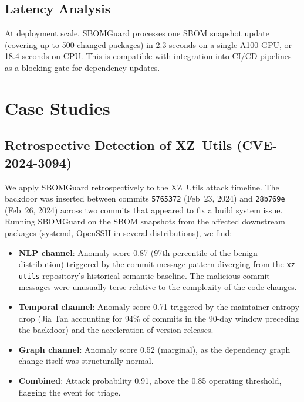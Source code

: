 \documentclass[sigconf,nonacm]{acmart}
\begin{document}
\subsection{Latency Analysis}

At deployment scale, SBOMGuard processes one SBOM snapshot update (covering up to
500 changed packages) in 2.3 seconds on a single A100 GPU, or 18.4 seconds on
CPU. This is compatible with integration into CI/CD pipelines as a blocking gate
for dependency updates.

\section{Case Studies}

\subsection{Retrospective Detection of XZ~Utils (CVE-2024-3094)}

We apply SBOMGuard retrospectively to the XZ~Utils attack timeline. The backdoor
was inserted between commits \texttt{5765372} (Feb~23, 2024) and \texttt{28b769e}
(Feb~26, 2024) across two commits that appeared to fix a build system issue.
Running SBOMGuard on the SBOM snapshots from the affected downstream packages
(systemd, OpenSSH in several distributions), we find:

\begin{itemize}
  \item \textbf{NLP channel}: Anomaly score 0.87 (97th percentile of the benign
        distribution) triggered by the commit message pattern diverging from the
        \texttt{xz-utils} repository's historical semantic baseline. The malicious
        commit messages were unusually terse relative to the complexity of the
        code changes.
  \item \textbf{Temporal channel}: Anomaly score 0.71 triggered by the maintainer
        entropy drop (Jia Tan accounting for 94\% of commits in the 90-day window
        preceding the backdoor) and the acceleration of version releases.
  \item \textbf{Graph channel}: Anomaly score 0.52 (marginal), as the dependency
        graph change itself was structurally normal.
  \item \textbf{Combined}: Attack probability 0.91, above the 0.85 operating
        threshold, flagging the event for triage.
\end{itemize}
\end{document}

